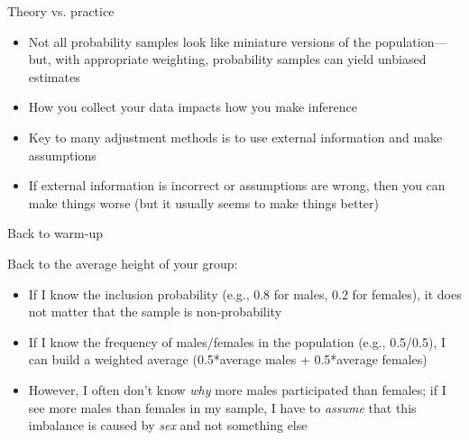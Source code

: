 \documentclass[aspectratio=169]{beamer}
\begin{document}
\begin{frame}{Theory vs. practice}

\begin{itemize}
\item 
Not all probability samples look like miniature versions of the population---but, with appropriate weighting, probability samples can yield unbiased estimates
\pause
\item How you collect your data impacts how you make inference
\pause
\item Key to many adjustment methods is to use external information and make assumptions
\pause
\item If external information is incorrect or assumptions are wrong, then you can make things worse (but it usually seems to make things better)
\end{itemize}

\end{frame}
\begin{frame}{Back to warm-up}

Back to the average height of your group:

\begin{itemize}
    \item If I know the inclusion probability (e.g., 0.8 for males, 0.2 for females), it does not matter that the sample is non-probability
    \item If I know the frequency of males/females in the population (e.g., 0.5/0.5), I can build a weighted average (0.5*average males + 0.5*average females)
    \item However, I often don't know \textit{why} more males participated than females; if I see more males than females in my sample, I have to \textit{assume} that this imbalance is caused by \textit{sex} and not something else
\end{itemize}

\end{frame}
\end{document}
